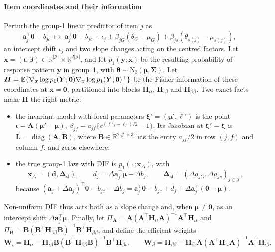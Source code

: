 \paragraph{Item coordinates and their information}
Perturb the group-1 linear predictor of item $j$ as
\begin{equation}\label{eq:id-coords}
  \bm a_j^\top\bm\theta-b_{jc}\ \longmapsto\ \bm a_j^\top\bm\theta-b_{jc}+\iota_j+\beta_{jG}(\theta_G-\mu_G)+\beta_{js}(\theta_{s(j)}-\mu_{s(j)}),
\end{equation}
an intercept shift $\iota_j$ and two slope changes acting on the centred factors. Let $\bm x=(\bm\iota,\bm\beta)\in\mathbb R^{|\mathcal J|}\times\mathbb R^{2|\mathcal J|}$, and let $p_1(\bm y;\bm x)$ be the resulting probability of response pattern $\bm y$ in group~1, with $\bm\theta\sim\mathrm N_3(\bm\mu,\bm\Sigma)$. Let $\bm H=\mathbb{E}\{\nabla_{\bm x}\log p_1(\bm Y;\bm0)\nabla_{\bm x}\log p_1(\bm Y;\bm0)^\top\}$ be the Fisher information of these coordinates at $\bm x=\bm0$, partitioned into blocks $\bm H_{\iota\iota}$, $\bm H_{\iota\beta}$ and $\bm H_{\beta\beta}$. Two exact facts make $\bm H$ the right metric:
\begin{itemize}
  \item the invariant model with focal parameters $\bm\xi'=(\bm\mu',\bm\ell')$ is the point $\bm\iota=\bm A(\bm\mu'-\bm\mu)$, $\beta_{jf}=a_{jf}\{e^{(\ell'_f-\ell_f)/2}-1\}$. Its Jacobian at $\bm\xi'=\bm\xi$ is $\bm L=\operatorname{diag}(\bm A,\bm B)$, where $\bm B\in\mathbb R^{2|\mathcal J|\times3}$ has the entry $a_{jf}/2$ in row $(j,f)$ and column $f$, and zeros elsewhere;
  \item the true group-1 law with DIF is $p_1(\cdot\,;\bm x_\Delta)$, with
  \begin{equation}\label{eq:id-xdelta}
    \bm x_\Delta=(\bm d,\bm\Delta_{\mathrm{sl}}),\qquad d_j=\Delta\bm a_j^\top\bm\mu-\Delta b_j,\qquad \bm\Delta_{\mathrm{sl}}=(\Delta a_{jG},\Delta a_{js})_{j\in\mathcal J},
  \end{equation}
  because $(\bm a_j+\Delta\bm a_j)^\top\bm\theta-b_{jc}-\Delta b_j=\bm a_j^\top\bm\theta-b_{jc}+d_j+\Delta\bm a_j^\top(\bm\theta-\bm\mu)$.
\end{itemize}
Non-uniform DIF thus acts both as a slope change and, when $\bm\mu\neq\bm0$, as an intercept shift $\Delta\bm a_j^\top\bm\mu$. Finally, let $\Pi_{\bm A}=\bm A(\bm A^\top\bm H_{\iota\iota}\bm A)^{-1}\bm A^\top\bm H_{\iota\iota}$ and $\Pi_{\bm B}=\bm B(\bm B^\top\bm H_{\beta\beta}\bm B)^{-1}\bm B^\top\bm H_{\beta\beta}$, and define the efficient weights
\[
  \bm W_\iota=\bm H_{\iota\iota}-\bm H_{\iota\beta}\bm B(\bm B^\top\bm H_{\beta\beta}\bm B)^{-1}\bm B^\top\bm H_{\beta\iota},\qquad
  \bm W_\beta=\bm H_{\beta\beta}-\bm H_{\beta\iota}\bm A(\bm A^\top\bm H_{\iota\iota}\bm A)^{-1}\bm A^\top\bm H_{\iota\beta}.
\]

